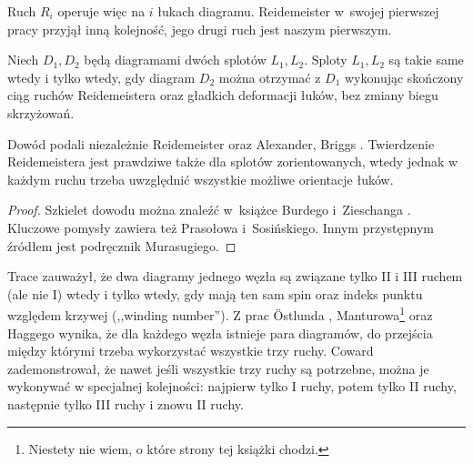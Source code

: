 Ruch $R_i$ operuje więc na $i$ łukach diagramu.
Reidemeister w~swojej pierwszej pracy przyjął inną kolejność, jego drugi ruch jest naszym pierwszym.

\begin{theorem}[Reidemeister, 1927]
\label{thm:reidemeister}%
%
%
    Niech $D_1, D_2$ będą diagramami dwóch splotów $L_1, L_2$.
    Sploty $L_1, L_2$ są takie same wtedy i tylko wtedy, gdy diagram $D_2$ można otrzymać z $D_1$ wykonując skończony ciąg ruchów Reidemeistera oraz gładkich deformacji łuków, bez zmiany biegu skrzyżowań.
\end{theorem}

Dowód podali niezależnie Reidemeister \cite{reidemeister27} oraz Alexander, Briggs \cite{briggs27}.
%
%
Twierdzenie Reidemeistera jest prawdziwe także dla splotów zorientowanych, wtedy jednak w każdym ruchu trzeba uwzględnić wszystkie możliwe orientacje łuków.

\begin{proof}
%
%
%
%
%
    Szkielet dowodu można znaleźć w~książce Burdego i~Zieschanga \cite[s. 9-11]{burde14}.
    Kluczowe pomysły zawiera też \cite[s. 11-12]{prasolov97} Prasołowa i~Sosińskiego.
    Innym przystępnym źródłem jest podręcznik \cite[s. 50-56]{murasugi96} Murasugiego.
\end{proof}

Trace \cite{trace83} zauważył, że dwa diagramy jednego węzła są związane tylko II i III ruchem (ale nie I) wtedy i tylko wtedy, gdy mają ten sam spin oraz indeks punktu względem krzywej (,,winding number'').
%
Z prac Östlunda \cite{ostlund01}, Manturowa\footnote{Niestety nie wiem, o które strony tej książki chodzi.} \cite{manturov04} oraz Haggego \cite{hagge06} wynika, że dla każdego węzła istnieje para diagramów, do przejścia między którymi trzeba wykorzystać wszystkie trzy ruchy.
%
%
%
Coward \cite{coward06} zademonstrował, że nawet jeśli wszystkie trzy ruchy są potrzebne, można je wykonywać w specjalnej kolejności: najpierw tylko I ruchy, potem tylko II ruchy, następnie tylko III ruchy i znowu II ruchy.
%

